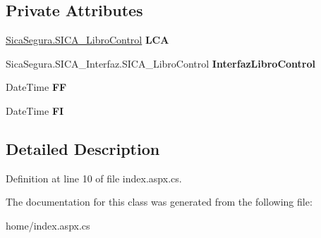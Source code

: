 \subsection*{Private Attributes}
\begin{DoxyCompactItemize}
\item 
\hyperlink{class_sica_segura_1_1_s_i_c_a___libro_control}{Sica\+Segura.\+S\+I\+C\+A\+\_\+\+Libro\+Control} {\bfseries L\+CA}\hypertarget{classlibrodigital__home__index_a60e83fef363bb0ed461b78a3d5111bda}{}\label{classlibrodigital__home__index_a60e83fef363bb0ed461b78a3d5111bda}

\item 
Sica\+Segura.\+S\+I\+C\+A\+\_\+\+Interfaz.\+S\+I\+C\+A\+\_\+\+Libro\+Control {\bfseries Interfaz\+Libro\+Control}\hypertarget{classlibrodigital__home__index_ac3897728e36c4c51775f715dc366a8f6}{}\label{classlibrodigital__home__index_ac3897728e36c4c51775f715dc366a8f6}

\item 
Date\+Time {\bfseries FF}\hypertarget{classlibrodigital__home__index_a6e0a141827fcc2d7197ad37014c30f09}{}\label{classlibrodigital__home__index_a6e0a141827fcc2d7197ad37014c30f09}

\item 
Date\+Time {\bfseries FI}\hypertarget{classlibrodigital__home__index_a8318e0d064bb6ef05dc70200b5b10590}{}\label{classlibrodigital__home__index_a8318e0d064bb6ef05dc70200b5b10590}

\end{DoxyCompactItemize}


\subsection{Detailed Description}


Definition at line 10 of file index.\+aspx.\+cs.



The documentation for this class was generated from the following file\+:\begin{DoxyCompactItemize}
\item 
home/index.\+aspx.\+cs\end{DoxyCompactItemize}
